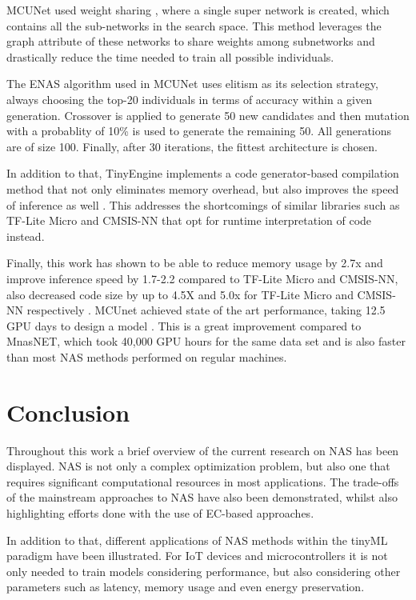 \documentclass[10pt,        %
               a4paper,     %
               journal,     %
               ]{IEEEtran}
\begin{document}
MCUNet used weight sharing \cite{lin2020mcunet}, where a single super network is created, which contains all the
sub-networks in the search space. This method leverages the graph attribute of these networks to share weights among
subnetworks and drastically reduce the time needed to train all possible individuals.

The ENAS algorithm used in MCUNet uses elitism as its selection strategy, always choosing the top-20 individuals in
terms of accuracy within a given generation. Crossover is applied to generate 50 new candidates and then mutation with a
probablity of 10\% is used to generate the remaining 50. All generations are of size 100. Finally, after 30 iterations,
the fittest architecture is chosen.

In addition to that, TinyEngine implements a code generator-based compilation method that not only eliminates memory overhead, but also improves
the speed of inference as well \cite{lin2020mcunet}. This addresses the shortcomings of similar libraries such as TF-Lite
Micro \cite{abadi2016tensorflow} and CMSIS-NN \cite{lai1801efficient} that opt for runtime interpretation of code instead.

Finally, this work has shown to be able to reduce memory usage by 2.7x and improve inference speed by 1.7-2.2
compared to TF-Lite Micro and CMSIS-NN, also decreased code size by up to 4.5X and 5.0x for TF-Lite Micro and CMSIS-NN
respectively \cite{lin2020mcunet}. MCUnet achieved state of the art performance, taking 12.5 GPU days to design a model
\cite{lin2020mcunet}. This is a great improvement compared to MnasNET, which took 40,000 GPU hours for the same
data set \cite{tan2019mnasnet} and is also faster than most NAS methods performed on regular machines.

\section{Conclusion}
Throughout this work a brief overview of the current research on NAS has been displayed. NAS is not only
a complex optimization problem, but also one that requires significant computational resources in most applications. The
trade-offs of the mainstream approaches to NAS have also been demonstrated, whilst also highlighting efforts done with the
use of EC-based approaches.

In addition to that, different applications of NAS methods within the tinyML paradigm have been illustrated.
For IoT devices and microcontrollers it is not only needed to train models considering performance,
but also considering other parameters such as latency, memory usage and even energy preservation.

\newpage



%
\end{document}
